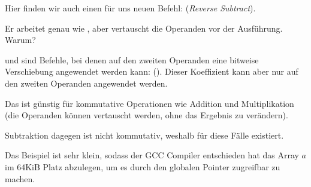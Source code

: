 Hier finden wir auch einen für uns neuen Befehl: \RSB (\emph{Reverse Subtract}).

Er arbeitet genau wie \SUB, aber vertauscht die Operanden vor der Ausführung. Warum?

\SUB und \RSB  sind Befehle, bei denen auf den zweiten Operanden eine bitweise Verschiebung angewendet werden kann:
().
Dieser Koeffizient kann aber nur auf den zweiten Operanden angewendet werden.

Das ist günstig für kommutative Operationen wie Addition und Multiplikation (die Operanden können vertauscht werden,
ohne das Ergebnis zu verändern).

Subtraktion dagegen ist nicht kommutativ, weshalb für diese Fälle \RSB existiert.


Das Beispiel ist sehr klein, sodass der GCC Compiler entschieden hat das Array $a$ im 64KiB Platz abzulegen, um es durch
den globalen Pointer zugreifbar zu machen.



